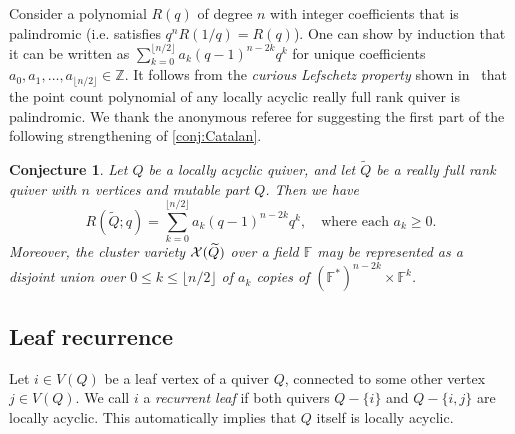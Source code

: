 \documentclass[11pt]{article}
\newtheorem{conjecture}[theo]{Conjecture}
\theoremstyle{definition}
\numberwithin{equation}{section}
\newcommand\Z{\mathbb{Z}}
\newcommand\Qice{\widetilde{Q}}
\def\RQice(#1){R(\Qice;#1)}
\newcommand\F{\mathbb{F}}
\newcommand\XQice{\Xcal(\Qice)}
\newcommand\Louise{locally acyclic\xspace}
\newcommand\Louiseleaf{recurrent leaf\xspace}
\begin{document}
Consider a polynomial $R(q)$ of degree $n$ with integer coefficients  that is palindromic (i.e.  satisfies $q^nR(1/q)=R(q)$). One can show by induction that it can be written as $\sum_{k=0}^{\lfloor n/2\rfloor} a_k (q-1)^{n-2k} q^k$ for unique coefficients $a_0,a_1,\dots,a_{\lfloor n/2\rfloor}\in\Z$. It follows from the \emph{curious Lefschetz property} shown in~\cite{LS} that the point count polynomial of any \Louise really full rank quiver is palindromic. We thank the anonymous referee for suggesting the first part of the following strengthening of \cref{conj:Catalan}. 
\begin{conjecture}
Let $Q$ be a \Louise quiver, and let $\Qice$ be a really full rank quiver with $n$ vertices and mutable part $Q$. Then we have 
\begin{equation*}%
  \RQice(q) = \sum_{k=0}^{\lfloor n/2\rfloor} a_k (q-1)^{n-2k} q^k, \quad\text{where each $a_k \geq0$.}
\end{equation*}
Moreover, the cluster variety $\XQice$ over a field $\F$ may be represented as a disjoint union over $0\leq k\leq\lfloor n/2\rfloor$ of $a_k$ copies of $(\F^\ast)^{n-2k} \times\F^k$.
\end{conjecture}
\setcounter{theo}{13}\setcounter{equation}{4}
\subsection{Leaf recurrence}
%
Let $i\in V(Q)$ be a leaf vertex of a quiver $Q$, connected to some other vertex $j\in V(Q)$. We call $i$ a \emph{\Louiseleaf} if both quivers $Q-\{i\}$ and $Q-\{i,j\}$ are \Louise.  This automatically implies that $Q$ itself is \Louise.

%
\end{document}
